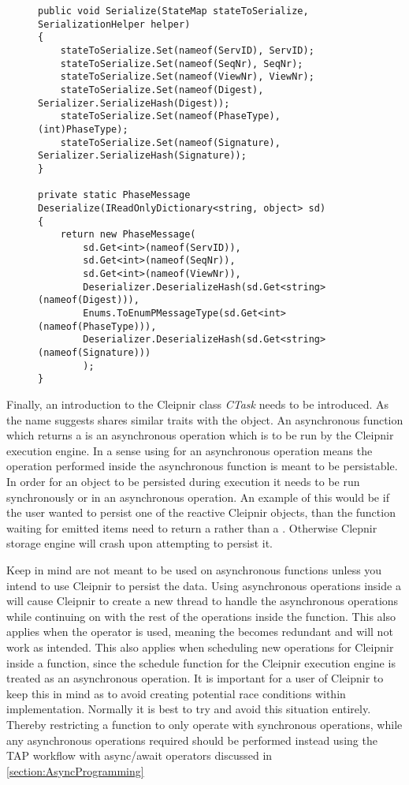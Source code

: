 \begin{figure}[H]
	\centering
	\lstset{style=sharpc}
	\begin{lstlisting}[label = code:seriadeseria, caption=Serialize/Deserialize code example, captionpos=b, basicstyle=\scriptsize]
public void Serialize(StateMap stateToSerialize, SerializationHelper helper)
{
    stateToSerialize.Set(nameof(ServID), ServID);
    stateToSerialize.Set(nameof(SeqNr), SeqNr);
    stateToSerialize.Set(nameof(ViewNr), ViewNr);
    stateToSerialize.Set(nameof(Digest), Serializer.SerializeHash(Digest));
    stateToSerialize.Set(nameof(PhaseType), (int)PhaseType);
    stateToSerialize.Set(nameof(Signature), Serializer.SerializeHash(Signature));
}

private static PhaseMessage Deserialize(IReadOnlyDictionary<string, object> sd)
{
    return new PhaseMessage(
        sd.Get<int>(nameof(ServID)),
        sd.Get<int>(nameof(SeqNr)),
        sd.Get<int>(nameof(ViewNr)),
        Deserializer.DeserializeHash(sd.Get<string>(nameof(Digest))),
        Enums.ToEnumPMessageType(sd.Get<int>(nameof(PhaseType))),
        Deserializer.DeserializeHash(sd.Get<string>(nameof(Signature)))
        );
}
	\end{lstlisting}
\end{figure}

Finally, an introduction to the Cleipnir class \emph{CTask} needs to be introduced. As the name suggests  shares similar traits with the  object. An asynchronous function which returns a  is an asynchronous operation which is to be run by the Cleipnir execution engine. In a sense using  for an asynchronous operation means the operation performed inside the asynchronous function is meant to be persistable. In order for an object to be persisted during execution it needs to be run synchronously or in an asynchronous  operation. An example of this would be if the user wanted to persist one of the reactive Cleipnir  objects, than the function waiting for emitted items need to return a  rather than a . Otherwise Clepnir storage engine will crash upon attempting to persist it. 

Keep in mind  are not meant to be used on asynchronous functions unless you intend to use Cleipnir to persist the data. Using asynchronous operations inside a  will cause Cleipnir to create a new thread to handle the asynchronous operations while continuing on with the rest of the operations inside the function. This also applies when the  operator is used, meaning the  becomes redundant and will not work as intended. This also applies when scheduling new operations for Cleipnir inside a  function, since the schedule function for the Cleipnir execution engine is treated as an asynchronous operation. It is important for a user of Cleipnir to keep this in mind as to avoid creating potential race conditions within implementation. Normally it is best to try and avoid this situation entirely. Thereby restricting a  function to only operate with synchronous operations, while any asynchronous operations required should be performed instead using the TAP workflow with async/await operators discussed in \autoref{section:AsyncProgramming}
